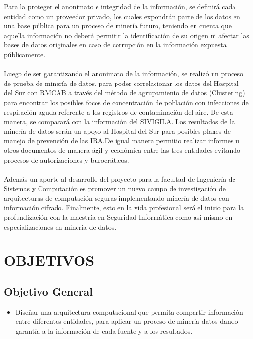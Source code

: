 \documentclass[a4paper,openright,12pt]{book}
\theoremstyle{definition}
\theoremstyle{remark}
\begin{document}
Para la proteger el anonimato e integridad de la información, se definirá cada entidad como un proveedor privado, los cuales expondrán parte de los datos en una base pública para un proceso de minería futuro, teniendo en cuenta que aquella información no deberá permitir la identificación de su origen ni afectar las bases de datos originales en caso de corrupción en la información expuesta públicamente.\\\\
Luego de ser garantizando el anonimato de la información, se realizó un proceso de prueba de minería de datos, para poder correlacionar los datos del Hospital del Sur con RMCAB a través del método de agrupamiento de datos (Clustering) para encontrar los posibles focos de concentración de población con infecciones de respiración aguda referente a los registros de contaminación del aire. De esta manera, se comparará con la información del SIVIGILA. Los resultados de la minería de datos serán un apoyo  al Hospital del Sur para posibles planes de manejo de prevención de las IRA.De igual manera permitio realizar informes u otros documentos de manera ágil y económica entre las tres entidades evitando procesos de autorizaciones y burocráticos.\\\\
Además un aporte al desarrollo del proyecto para la facultad de Ingeniería de Sistemas y Computación es promover un nuevo campo de investigación de arquitecturas de computación seguras implementando minería de datos con información cifrado. Finalmente, esto en la vida profesional será el inicio para la profundización con la maestría en Seguridad Informática como así mismo en especializaciones en minería de datos.

\section{OBJETIVOS}

\subsection{Objetivo General}
\begin{itemize}
\item Diseñar una arquitectura computacional que permita compartir información entre diferentes entidades, para aplicar un proceso de minería datos dando garantía a la información de cada fuente y a los resultados. 
\end{itemize}
\end{document}
